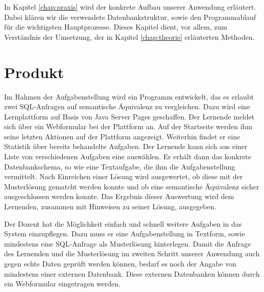 In Kapitel \ref{chap:praxis} wird der konkrete Aufbau unserer Anwendung erläutert. Dabei klären wir die verwendete Datenbankstruktur, sowie den Programmablauf für die wichtigsten Hauptprozesse. Dieses Kapitel dient, vor allem, zum Verständnis der Umsetzung, der in Kapitel \ref{chap:theorie} erläuterten Methoden.

\section{Produkt}

Im Rahmen der Aufgabenstellung wird ein Programm entwickelt, das es erlaubt zwei SQL-Anfragen auf semantische Äquivalenz zu vergleichen. Dazu wird eine Lernplattform auf Basis von Java Server Pages geschaffen. Der Lernende meldet sich über ein Webformular bei der Plattform an. Auf der Startseite werden ihm seine letzten Aktionen auf der Plattform angezeigt. Weiterhin findet er eine Statistik über bereits behandelte Aufgaben. Der Lernende kann sich aus einer Liste von verschiedenen Aufgaben eine auswählen. Er erhält dann das konkrete Datenbankschema, so wie eine Textaufgabe, die ihm die Aufgabenstellung vermittelt. Nach Einreichen einer Lösung wird ausgewertet, ob diese mit der Musterlösung gematcht werden konnte und ob eine semantische Äquivalenz sicher ausgeschlossen werden konnte. Das Ergebnis dieser Auswertung wird dem Lernenden, zusammen mit Hinweisen zu seiner Lösung, ausgegeben.

Der Dozent hat die Möglichkeit einfach und schnell weitere Aufgaben in das System einzupflegen. Dazu muss er eine Aufgabenstellung in Textform, sowie mindestens eine SQL-Anfrage als Musterlösung hinterlegen. Damit die Anfrage des Lernenden und die Musterlösung im zweiten Schritt unserer Anwendung auch gegen echte Daten geprüft werden können, bedarf es noch der Angabe von mindestens einer externen Datenbank. Diese externen Datenbanken können durch ein Webformular eingetragen werden.

